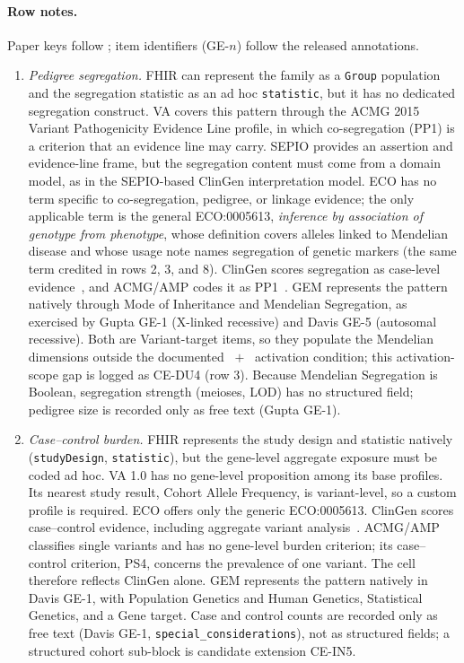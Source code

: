 \paragraph{Row notes.}
Paper keys follow ; item identifiers (GE-$n$) follow the
released annotations.

\begin{enumerate}
  \item \emph{Pedigree segregation.} FHIR can represent the family as a
    \texttt{Group} population and the segregation statistic as an ad hoc
    \texttt{statistic}, but it has no dedicated segregation construct. VA
    covers this pattern through the ACMG 2015 Variant Pathogenicity Evidence
    Line profile, in which co-segregation (PP1) is a criterion that an
    evidence line may carry. SEPIO provides an assertion and evidence-line
    frame, but the segregation content must come from a domain model, as in
    the SEPIO-based ClinGen interpretation model. ECO has no term specific
    to co-segregation, pedigree, or linkage evidence; the only applicable
    term is the general ECO:0005613, \emph{inference by association of
    genotype from phenotype}, whose definition covers alleles linked to
    Mendelian disease and whose usage note names segregation of genetic
    markers (the same term credited in rows 2, 3, and 8). ClinGen
    scores segregation as case-level evidence~\cite{strande2017}, and
    ACMG/AMP codes it as PP1~\cite{acmg2015}. GEM represents the pattern
    natively through Mode of Inheritance and Mendelian Segregation, as
    exercised by Gupta GE-1 (X-linked recessive) and Davis GE-5
    (autosomal recessive). Both are Variant-target items, so they populate
    the Mendelian dimensions outside the documented ~$+$~ activation condition; this activation-scope
    gap is logged as CE-DU4 (row 3). Because Mendelian Segregation is
    Boolean, segregation strength (meioses, LOD) has no structured field;
    pedigree size is recorded only as free text (Gupta GE-1).

  \item \emph{Case--control burden.} FHIR represents the study design and
    statistic natively (\texttt{studyDesign}, \texttt{statistic}), but the
    gene-level aggregate exposure must be coded ad hoc. VA 1.0 has
    no gene-level proposition among its base profiles. Its nearest study
    result, Cohort Allele Frequency, is variant-level, so a custom profile
    is required. ECO offers only the generic ECO:0005613. ClinGen scores
    case--control evidence, including aggregate variant
    analysis~\cite{strande2017}. ACMG/AMP classifies single variants and
    has no gene-level burden criterion; its case--control criterion, PS4,
    concerns the prevalence of one variant. The cell therefore reflects
    ClinGen alone. GEM represents the pattern natively in
    Davis GE-1, with Population Genetics and Human Genetics, Statistical
    Genetics, and a Gene target. Case and control counts are recorded only as
    free text (Davis GE-1, \texttt{special\_considerations}), not as
    structured fields; a structured cohort sub-block is candidate extension
    CE-IN5.


\end{enumerate}
